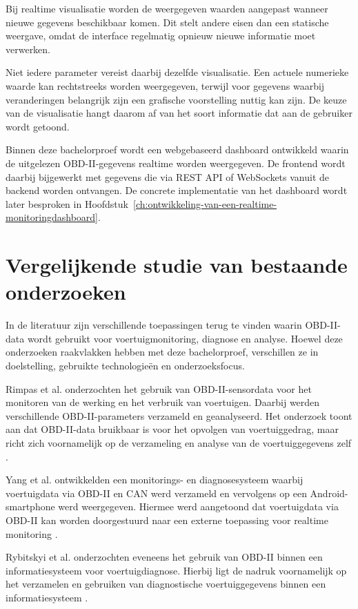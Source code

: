 Bij realtime visualisatie worden de weergegeven waarden aangepast wanneer
nieuwe gegevens beschikbaar komen. Dit stelt andere eisen dan een statische
weergave, omdat de interface regelmatig opnieuw nieuwe informatie moet
verwerken.

Niet iedere parameter vereist daarbij dezelfde visualisatie. Een actuele
numerieke waarde kan rechtstreeks worden weergegeven, terwijl voor gegevens
waarbij veranderingen belangrijk zijn een grafische voorstelling nuttig kan
zijn. De keuze van de visualisatie hangt daarom af van het soort informatie dat
aan de gebruiker wordt getoond.

Binnen deze bachelorproef wordt een webgebaseerd dashboard ontwikkeld waarin
de uitgelezen OBD-II-gegevens realtime worden weergegeven. De frontend wordt
daarbij bijgewerkt met gegevens die via REST API of WebSockets vanuit de
backend worden ontvangen. De concrete implementatie van het dashboard wordt
later besproken in
Hoofdstuk~\ref{ch:ontwikkeling-van-een-realtime-monitoringdashboard}.

\section{Vergelijkende studie van bestaande onderzoeken}
In de literatuur zijn verschillende toepassingen terug te vinden waarin
OBD-II-data wordt gebruikt voor voertuigmonitoring, diagnose en analyse.
Hoewel deze onderzoeken raakvlakken hebben met deze bachelorproef, verschillen
ze in doelstelling, gebruikte technologieën en onderzoeksfocus.

Rimpas et al. onderzochten het gebruik van OBD-II-sensordata voor het monitoren
van de werking en het verbruik van voertuigen. Daarbij werden verschillende
OBD-II-parameters verzameld en geanalyseerd. Het onderzoek toont aan dat
OBD-II-data bruikbaar is voor het opvolgen van voertuiggedrag, maar richt zich
voornamelijk op de verzameling en analyse van de voertuiggegevens zelf
\autocite{RIMPAS202055}.

Yang et al. ontwikkelden een monitorings- en diagnosesysteem waarbij
voertuigdata via OBD-II en CAN werd verzameld en vervolgens op een
Android-smartphone werd weergegeven. Hiermee werd aangetoond dat voertuigdata
via OBD-II kan worden doorgestuurd naar een externe toepassing voor realtime
monitoring \autocite{SageJournals2013}.

Rybitskyi et al. onderzochten eveneens het gebruik van OBD-II binnen een
informatiesysteem voor voertuigdiagnose. Hierbij ligt de nadruk voornamelijk op
het verzamelen en gebruiken van diagnostische voertuiggegevens binnen een
informatiesysteem \autocite{Rybitskyi2023}.

